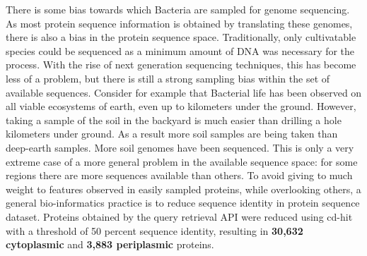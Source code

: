 There is some bias towards which Bacteria are sampled for genome sequencing.
As most protein sequence information is obtained by translating these genomes,
there is also a bias in the protein sequence space.
Traditionally, only cultivatable species could be sequenced as a minimum amount of DNA was necessary for the process.
With the rise of next generation sequencing techniques, 
this has become less of a problem,
but there is still a strong sampling bias within the set of available sequences. 
Consider for example that Bacterial life has been observed on all viable ecosystems of earth, 
even up to kilometers under the ground.
However, taking a sample of the soil in the backyard is much easier than drilling a hole kilometers under ground.
As a result more soil samples are being taken than deep-earth samples.
More soil genomes have been sequenced.
This is only a very extreme case of a more general problem in the available sequence space:
for some regions there are more sequences available than others.
To avoid giving to much weight to features observed in easily sampled proteins, 
while overlooking others,
a general bio-informatics practice is to reduce sequence identity in protein sequence dataset.
Proteins obtained by the query retrieval API were reduced using cd-hit with a threshold of 50 percent sequence identity,
resulting in \textbf{30,632 cytoplasmic} and \textbf{3,883 periplasmic} proteins.
